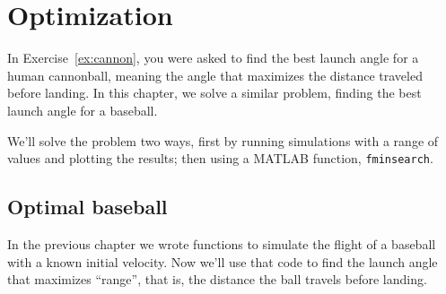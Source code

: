 \documentclass[
]{book}
\numberwithin{Answer}{chapter}
\numberwithin{Exercise}{chapter}
\renewcommand{\vec}[1]{\bm{\mathbf{#1}}}
\newcommand{\uveci}{{\bm{\hat{\textnormal{\bfseries\i}}}}}
\newcommand{\uvecj}{{\bm{\hat{\textnormal{\bfseries\j}}}}}
\newcommand{\uvec}[1]{%
    \ifthenelse{\equal{#1}{i}}%
        {\uveci}{%
    \ifthenelse{\equal{#1}{j}}%
        {\uvecj}{%
    {\bm{\hat{\mathbf{#1}}}}%
}}}
\begin{document}

%
%
%
%
%
%
%


\chapter{Optimization}

In Exercise~\ref{ex:cannon}, you were asked to find the best launch angle for a human cannonball, meaning the angle that maximizes the distance traveled before landing.  In this chapter, we solve a similar problem, finding the best launch angle for a baseball.


We'll solve the problem two ways, first by running simulations with a range of values and plotting the results; then using a MATLAB function, {\tt fminsearch}.


\section{Optimal baseball}

In the previous chapter we wrote functions to simulate the flight of a baseball with a known initial velocity.  Now we'll use that code to find the launch angle that maximizes ``range'', that is, the distance the ball travels before landing.
\end{document}
